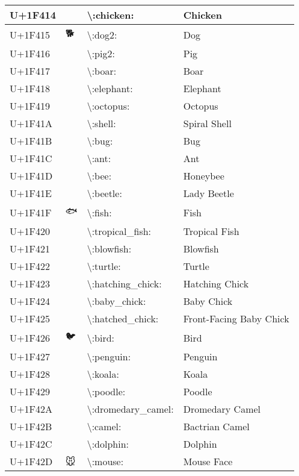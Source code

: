 \begin{table}[h]
\begin{tabulary}{\linewidth}{|L|L|L|L|}
U+1F414 & 🐔 & {\textbackslash}:chicken: & Chicken \\
\hline
U+1F415 & 🐕 & {\textbackslash}:dog2: & Dog \\
\hline
U+1F416 & 🐖 & {\textbackslash}:pig2: & Pig \\
\hline
U+1F417 & 🐗 & {\textbackslash}:boar: & Boar \\
\hline
U+1F418 & 🐘 & {\textbackslash}:elephant: & Elephant \\
\hline
U+1F419 & 🐙 & {\textbackslash}:octopus: & Octopus \\
\hline
U+1F41A & 🐚 & {\textbackslash}:shell: & Spiral Shell \\
\hline
U+1F41B & 🐛 & {\textbackslash}:bug: & Bug \\
\hline
U+1F41C & 🐜 & {\textbackslash}:ant: & Ant \\
\hline
U+1F41D & 🐝 & {\textbackslash}:bee: & Honeybee \\
\hline
U+1F41E & 🐞 & {\textbackslash}:beetle: & Lady Beetle \\
\hline
U+1F41F & 🐟 & {\textbackslash}:fish: & Fish \\
\hline
U+1F420 & 🐠 & {\textbackslash}:tropical\_fish: & Tropical Fish \\
\hline
U+1F421 & 🐡 & {\textbackslash}:blowfish: & Blowfish \\
\hline
U+1F422 & 🐢 & {\textbackslash}:turtle: & Turtle \\
\hline
U+1F423 & 🐣 & {\textbackslash}:hatching\_chick: & Hatching Chick \\
\hline
U+1F424 & 🐤 & {\textbackslash}:baby\_chick: & Baby Chick \\
\hline
U+1F425 & 🐥 & {\textbackslash}:hatched\_chick: & Front-Facing Baby Chick \\
\hline
U+1F426 & 🐦 & {\textbackslash}:bird: & Bird \\
\hline
U+1F427 & 🐧 & {\textbackslash}:penguin: & Penguin \\
\hline
U+1F428 & 🐨 & {\textbackslash}:koala: & Koala \\
\hline
U+1F429 & 🐩 & {\textbackslash}:poodle: & Poodle \\
\hline
U+1F42A & 🐪 & {\textbackslash}:dromedary\_camel: & Dromedary Camel \\
\hline
U+1F42B & 🐫 & {\textbackslash}:camel: & Bactrian Camel \\
\hline
U+1F42C & 🐬 & {\textbackslash}:dolphin: & Dolphin \\
\hline
U+1F42D & 🐭 & {\textbackslash}:mouse: & Mouse Face \\

\end{tabulary}
\end{table}

